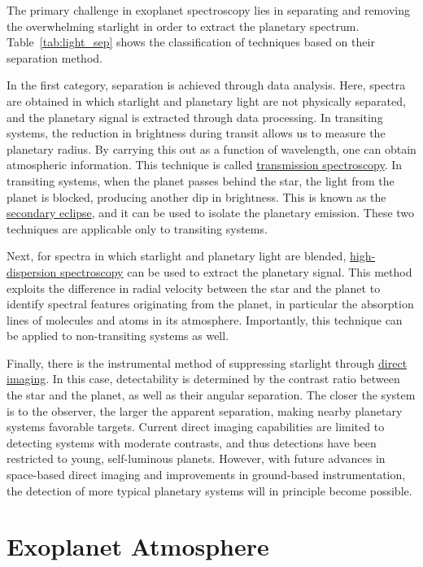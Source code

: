 \documentclass[a4paper,twocolumn]{report}
\begin{document}
The primary challenge in exoplanet spectroscopy lies in separating and removing the overwhelming starlight in order to extract the planetary spectrum. Table~\ref{tab:light_sep} shows the classification of techniques based on their separation method.  

In the first category, separation is achieved through data analysis. Here, spectra are obtained in which starlight and planetary light are not physically separated, and the planetary signal is extracted through data processing. In transiting systems, the reduction in brightness during transit allows us to measure the planetary radius. By carrying this out as a function of wavelength, one can obtain atmospheric information. This technique is called \underline{transmission spectroscopy}. In transiting systems, when the planet passes behind the star, the light from the planet is blocked, producing another dip in brightness. This is known as the \underline{secondary eclipse}, and it can be used to isolate the planetary emission. These two techniques are applicable only to transiting systems.  

Next, for spectra in which starlight and planetary light are blended, \underline{high-dispersion spectroscopy} can be used to extract the planetary signal. This method exploits the difference in radial velocity between the star and the planet to identify spectral features originating from the planet, in particular the absorption lines of molecules and atoms in its atmosphere. Importantly, this technique can be applied to non-transiting systems as well.  

Finally, there is the instrumental method of suppressing starlight through \underline{direct imaging}. In this case, detectability is determined by the contrast ratio between the star and the planet, as well as their angular separation. The closer the system is to the observer, the larger the apparent separation, making nearby planetary systems favorable targets. Current direct imaging capabilities are limited to detecting systems with moderate contrasts, and thus detections have been restricted to young, self-luminous planets. However, with future advances in space-based direct imaging and improvements in ground-based instrumentation, the detection of more typical planetary systems will in principle become possible.  





\chapter{Exoplanet Atmosphere}



\end{document}
